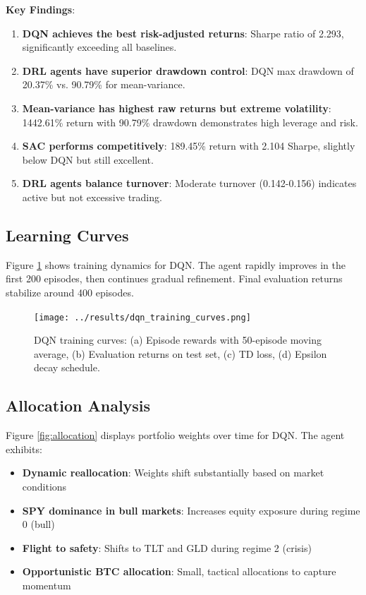 \documentclass[12pt]{article}
\begin{document}
\textbf{Key Findings}:

\begin{enumerate}
    \item \textbf{DQN achieves the best risk-adjusted returns}: Sharpe ratio of 2.293, significantly exceeding all baselines.

    \item \textbf{DRL agents have superior drawdown control}: DQN max drawdown of 20.37\% vs. 90.79\% for mean-variance.

    \item \textbf{Mean-variance has highest raw returns but extreme volatility}: 1442.61\% return with 90.79\% drawdown demonstrates high leverage and risk.

    \item \textbf{SAC performs competitively}: 189.45\% return with 2.104 Sharpe, slightly below DQN but still excellent.

    \item \textbf{DRL agents balance turnover}: Moderate turnover (0.142-0.156) indicates active but not excessive trading.
\end{enumerate}

\subsection{Learning Curves}

Figure \ref{fig:learning} shows training dynamics for DQN. The agent rapidly improves in the first 200 episodes, then continues gradual refinement. Final evaluation returns stabilize around 400 episodes.

\begin{figure}[h]
    \centering
    \texttt{[image: ../results/dqn\_training\_curves.png]}
    \caption{DQN training curves: (a) Episode rewards with 50-episode moving average, (b) Evaluation returns on test set, (c) TD loss, (d) Epsilon decay schedule.}
    \label{fig:learning}
\end{figure}

\subsection{Allocation Analysis}

Figure \ref{fig:allocation} displays portfolio weights over time for DQN. The agent exhibits:

\begin{itemize}
    \item \textbf{Dynamic reallocation}: Weights shift substantially based on market conditions
    \item \textbf{SPY dominance in bull markets}: Increases equity exposure during regime 0 (bull)
    \item \textbf{Flight to safety}: Shifts to TLT and GLD during regime 2 (crisis)
    \item \textbf{Opportunistic BTC allocation}: Small, tactical allocations to capture momentum
\end{itemize}
\end{document}
